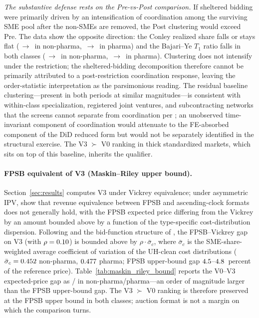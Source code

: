 \emph{The substantive defense rests on the Pre-vs-Post comparison.} If sheltered bidding were primarily driven by an intensification of coordination among the surviving SME pool after the non-SMEs are removed, the Post clustering would exceed Pre. The data show the opposite direction: the Conley realized share falls or stays flat (\collConleyRealPreNp{}\,$\to$\,\collConleyRealPostNp{} in non-pharma, \collConleyRealPrePh{}\,$\to$\,\collConleyRealPostPh{} in pharma) and the Bajari--Ye $T_1$ ratio falls in both classes (\collBYRatioPreNp{}\,$\to$\,\collBYRatioPostNp{} in non-pharma, \collBYRatioPrePh{}\,$\to$\,\collBYRatioPostPh{} in pharma). Clustering does not intensify under the restriction; the sheltered-bidding decomposition therefore cannot be primarily attributed to a post-restriction coordination response, leaving the order-statistic interpretation as the parsimonious reading. The residual baseline clustering---present in both periods at similar magnitudes---is consistent with within-class specialization, registered joint ventures, and subcontracting networks that the screens cannot separate from coordination per \citet{conley2016}; an unobserved time-invariant component of coordination would attenuate to the FE-absorbed component of the DiD reduced form but would not be separately identified in the structural exercise. The V3 $\succ$ V0 ranking in thick standardized markets, which sits on top of this baseline, inherits the qualifier.

\paragraph{FPSB equivalent of V3 (Maskin--Riley upper bound).}\label{sec:fpsb_bound} Section~\ref{sec:results} computes V3 under Vickrey equivalence; under asymmetric IPV, \citet{maskinriley2000} show that revenue equivalence between FPSB and ascending-clock formats does not generally hold, with the FPSB expected price differing from the Vickrey by an amount bounded above by a function of the type-specific cost-distribution dispersion. Following \citet{maskinriley2000} and the bid-function structure of \citet{lebrun1999}, the FPSB--Vickrey gap on V3 (with $\rho = 0.10$) is bounded above by $\rho \cdot \bar\sigma_c$, where $\bar\sigma_c$ is the SME-share-weighted average coefficient of variation of the UH-clean cost distributions ($\bar\sigma_c = 0.452$ non-pharma, $0.477$ pharma; FPSB upper-bound gap $4.5$--$4.8$~percent of the reference price). Table~\ref{tab:maskin_riley_bound} reports the V0--V3 expected-price gap as \vZeroVThreeNp{}/\vZeroVThreePh{} in non-pharma/pharma---an order of magnitude larger than the FPSB upper-bound gap. The V3 $\succ$ V0 ranking is therefore preserved at the FPSB upper bound in both classes; auction format is not a margin on which the comparison turns.


